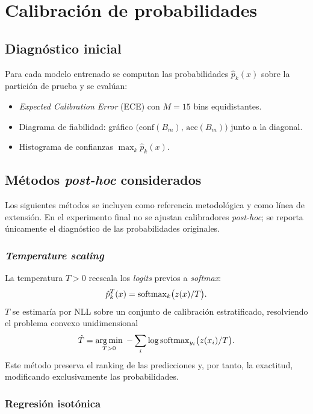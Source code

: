\chapter{Calibración de probabilidades}\label{cap:calibracion}

\section{Diagnóstico inicial}

Para cada modelo entrenado se computan las probabilidades $\hat{p}_k(x)$
sobre la partición de prueba y se evalúan:
\begin{itemize}[leftmargin=*,itemsep=0.2em]
  \item \emph{Expected Calibration Error} (ECE) con $M = 15$ bins
        equidistantes.
  \item Diagrama de fiabilidad: gráfico
        $\bigl(\mathrm{conf}(B_m),\,\mathrm{acc}(B_m)\bigr)$ junto a la
        diagonal.
  \item Histograma de confianzas $\max_k \hat{p}_k(x)$.
\end{itemize}

\section{Métodos \emph{post-hoc} considerados}

Los siguientes métodos se incluyen como referencia metodológica y como
línea de extensión. En el experimento final no se ajustan calibradores
\emph{post-hoc}; se reporta únicamente el diagnóstico de las
probabilidades originales.

\subsection{\emph{Temperature scaling}}

La temperatura $T > 0$ reescala los \emph{logits} previos a
\emph{softmax}:
\[
  \hat{p}^T_k(x) = \operatorname{softmax}_k\bigl(z(x) / T\bigr).
\]
$T$ se estimaría por NLL sobre un conjunto de calibración
estratificado, resolviendo el problema convexo
unidimensional
\[
  \hat{T} = \operatorname*{arg\,min}_{T > 0}\;
  -\sum_i \log \operatorname{softmax}_{y_i}\bigl(z(x_i) / T\bigr).
\]
Este método preserva el ranking de las predicciones y, por tanto, la
exactitud, modificando exclusivamente las probabilidades.

\subsection{Regresión isotónica}

